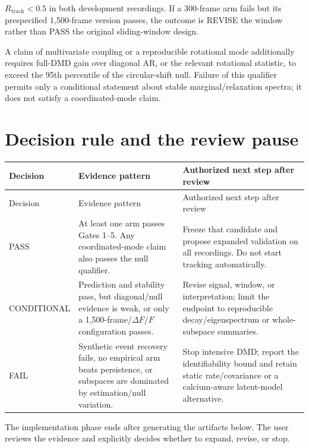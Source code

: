 \documentclass[11pt,a4paper]{article}
\begin{document}
\begin{gatebox}
$R_{\mathrm{track}}<0.5$ in both development recordings. If a 300-frame arm
fails but its prespecified 1,500-frame version passes, the outcome is REVISE the
window rather than PASS the original sliding-window design.
\end{gatebox}

\begin{riskbox}
A claim of multivariate coupling or a reproducible rotational mode additionally
requires full-DMD gain over diagonal AR, or the relevant rotational statistic,
to exceed the 95th percentile of the circular-shift null. Failure of this
qualifier permits only a conditional statement about stable marginal/relaxation
spectra; it does not satisfy a coordinated-mode claim.
\end{riskbox}

\section{Decision rule and the review pause}

\begin{longtable}{@{}P{0.17\textwidth}P{0.48\textwidth}P{0.27\textwidth}@{}}
\toprule
Decision & Evidence pattern & Authorized next step after review\\
\midrule
\endfirsthead
\toprule
Decision & Evidence pattern & Authorized next step after review\\
\midrule
\endhead
PASS & At least one arm passes Gates 1--5. Any coordinated-mode claim also
passes the null qualifier. & Freeze that candidate and propose expanded
validation on all recordings. Do not start tracking automatically.\\
CONDITIONAL & Prediction and stability pass, but diagonal/null evidence is weak,
or only a 1,500-frame/$\Delta F/F$ configuration passes. & Revise signal, window,
or interpretation; limit the endpoint to reproducible decay/eigenspectrum or
whole-subspace summaries.\\
FAIL & Synthetic event recovery fails, no empirical arm beats persistence, or
subspaces are dominated by estimation/null variation. & Stop intensive DMD;
report the identifiability bound and retain static rate/covariance or a
calcium-aware latent-model alternative.\\
\bottomrule
\end{longtable}

The implementation phase ends after generating the artifacts below. The user
reviews the evidence and explicitly decides whether to expand, revise, or stop.
\end{document}
